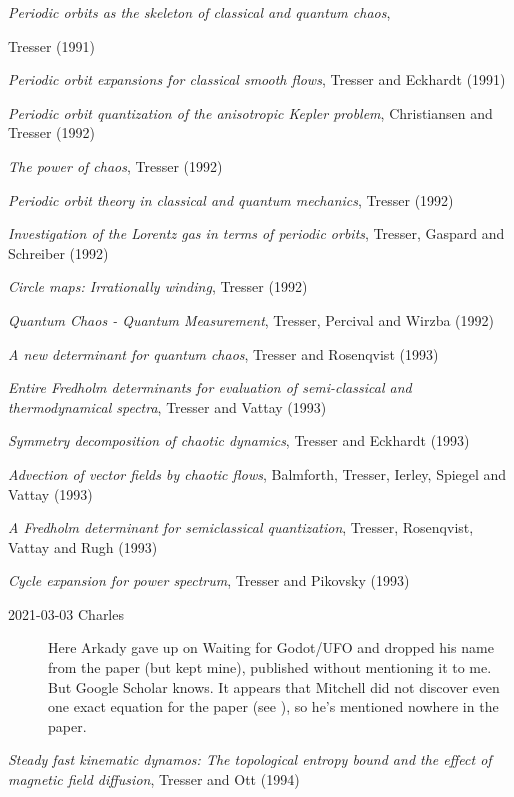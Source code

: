 {\em Periodic orbits as the skeleton of classical and quantum chaos},
{Tresser
{(1991)}

{\em Periodic orbit expansions for classical smooth flows},
{Tresser and Eckhardt}
{(1991)}

{\em Periodic orbit quantization of the anisotropic {Kepler} problem},
{Christiansen and Tresser}
{(1992)}

{\em The power of chaos},
{Tresser}
{(1992)}

{\em Periodic orbit theory in classical and quantum mechanics},
{Tresser}
{(1992)}

{\em Investigation of the {Lorentz} gas in terms of periodic orbits},
{Tresser, Gaspard and Schreiber}
{(1992)}

 {\em Circle maps: {Irrationally} winding},
{Tresser}
{(1992)}

{\em {Quantum Chaos - Quantum Measurement}},
{Tresser, Percival and Wirzba}
{(1992)}

{\em A new determinant for quantum chaos},
{Tresser and Rosenqvist}
{(1993)}

{\em Entire {Fredholm} determinants for evaluation of semi-classical and
thermodynamical spectra},
{Tresser and Vattay}
{(1993)}

{\em Symmetry decomposition of chaotic dynamics},
{Tresser and Eckhardt}
{(1993)}

{\em Advection of vector fields by chaotic flows},
{Balmforth, Tresser, Ierley, Spiegel and Vattay}
{(1993)}

{\em A {Fredholm} determinant for semiclassical quantization},
{Tresser, Rosenqvist, Vattay and Rugh}
{(1993)}

{\em Cycle expansion for power spectrum},
{Tresser and Pikovsky}
{(1993)}

\begin{description}
  \item[2021-03-03 Charles]
Here Arkady gave up on Waiting for Godot/UFO and dropped his name from
the paper (but kept mine), published without mentioning it to me. But
Google Scholar knows. It appears that Mitchell did not discover even one
exact equation for the paper
(see ), so he's mentioned nowhere in the paper.
\end{description}

{\em Steady fast kinematic dynamos: {The} topological entropy bound and
the effect of magnetic field diffusion},
{Tresser and Ott}
{(1994)}

}
